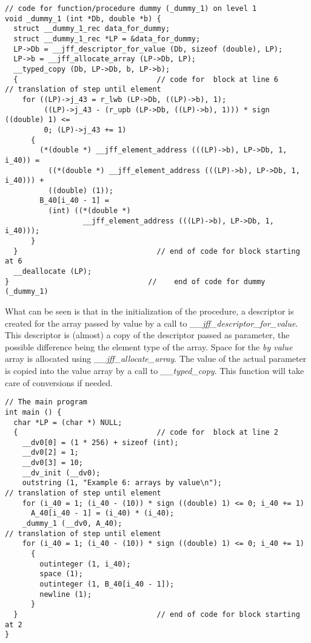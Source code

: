 \documentclass[11pt]{article}
\begin{document}
{\footnotesize
\begin{verbatim}
// code for function/procedure dummy (_dummy_1) on level 1
void _dummy_1 (int *Db, double *b) {
  struct __dummy_1_rec data_for_dummy;
  struct __dummy_1_rec *LP = &data_for_dummy;
  LP->Db = __jff_descriptor_for_value (Db, sizeof (double), LP);
  LP->b = __jff_allocate_array (LP->Db, LP);
  __typed_copy (Db, LP->Db, b, LP->b);
  {                                // code for  block at line 6 
// translation of step until element
    for ((LP)->j_43 = r_lwb (LP->Db, ((LP)->b), 1);
         ((LP)->j_43 - (r_upb (LP->Db, ((LP)->b), 1))) * sign ((double) 1) <=
         0; (LP)->j_43 += 1)
      {
        (*(double *) __jff_element_address (((LP)->b), LP->Db, 1, i_40)) =
          ((*(double *) __jff_element_address (((LP)->b), LP->Db, 1, i_40))) +
          ((double) (1));
        B_40[i_40 - 1] =
          (int) ((*(double *)
                  __jff_element_address (((LP)->b), LP->Db, 1, i_40)));
      }
  }                                // end of code for block starting at 6
  __deallocate (LP);
}                                //    end of code for dummy (_dummy_1)
\end{verbatim}
}
What can be seen is that in the initialization of the procedure,
a descriptor is created for the array passed by value by a call
to {\em \_\_jff\_descriptor\_for\_value}.
This descriptor
is (almost) a copy of the descriptor passed as parameter, 
the possible difference being the element type of the array.
Space for the {\em by value} array is allocated using {\em \_\_jff\_allocate\_array}.
The value of the actual parameter is copied into the value array by
a call to {\em \_\_typed\_copy}. This function will take care of
conversions if needed.
{\footnotesize
\begin{verbatim}
// The main program
int main () {
  char *LP = (char *) NULL;
  {                                // code for  block at line 2 
    __dv0[0] = (1 * 256) + sizeof (int);
    __dv0[2] = 1;
    __dv0[3] = 10;
    __dv_init (__dv0);
    outstring (1, "Example 6: arrays by value\n");
// translation of step until element
    for (i_40 = 1; (i_40 - (10)) * sign ((double) 1) <= 0; i_40 += 1)
      A_40[i_40 - 1] = (i_40) * (i_40);
    _dummy_1 (__dv0, A_40);
// translation of step until element
    for (i_40 = 1; (i_40 - (10)) * sign ((double) 1) <= 0; i_40 += 1)
      {
        outinteger (1, i_40);
        space (1);
        outinteger (1, B_40[i_40 - 1]);
        newline (1);
      }
  }                                // end of code for block starting at 2
}
\end{verbatim}
}
\end{document}
